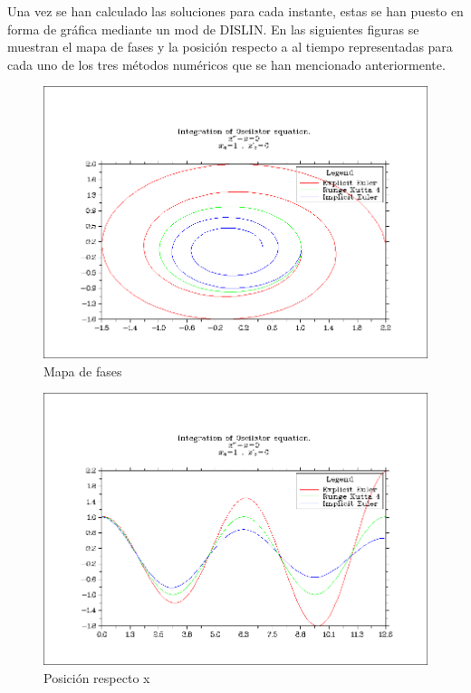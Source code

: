 \documentclass{article}
\begin{document}
	Una vez se han calculado las soluciones para cada instante, estas se han puesto en forma de gráfica mediante un mod de DISLIN. En las siguientes figuras se muestran el mapa de fases y la posición respecto a al tiempo representadas para cada uno de los tres métodos numéricos que se han mencionado anteriormente.
	
	\begin{figure}[h!]
		\begin{center}
			\includegraphics[scale=0.35]{px.png}
			\caption{Mapa de fases}
		\end{center}
	\end{figure}

	\newpage
	
	\begin{figure}[h!]
		\begin{center}
			\includegraphics[scale=0.35]{xt.png}
			\caption{Posición respecto x}
		\end{center}
	\end{figure}
\end{document}
